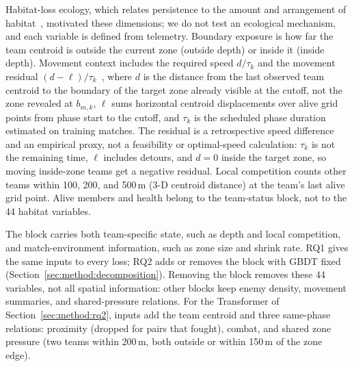 \documentclass[sigconf,anonymous,nonacm]{acmart}
\begin{document}
Habitat-loss ecology, which relates persistence to the amount and arrangement of habitat~\cite{Fahrig03}, motivated these dimensions; we do not test an ecological mechanism, and each variable is defined from telemetry. Boundary exposure is how far the team centroid is outside the current zone (outside depth) or inside it (inside depth). Movement context includes the required speed $d/\tau_k$ and the movement residual $(d-\ell)/\tau_k$~\cite{Nathan08}, where $d$ is the distance from the last observed team centroid to the boundary of the target zone already visible at the cutoff, not the zone revealed at $b_{m,k}$, $\ell$ sums horizontal centroid displacements over alive grid points from phase start to the cutoff, and $\tau_k$ is the scheduled phase duration estimated on training matches. The residual is a retrospective speed difference and an empirical proxy, not a feasibility or optimal-speed calculation: $\tau_k$ is not the remaining time, $\ell$ includes detours, and $d=0$ inside the target zone, so moving inside-zone teams get a negative residual. Local competition counts other teams within 100, 200, and 500\,m (3-D centroid distance) at the team's last alive grid point. Alive members and health belong to the team-status block, not to the 44 habitat variables.

The block carries both team-specific state, such as depth and local competition, and match-environment information, such as zone size and shrink rate. RQ1 gives the same inputs to every loss; RQ2 adds or removes the block with GBDT fixed (Section~\ref{sec:method:decomposition}). Removing the block removes these 44 variables, not all spatial information: other blocks keep enemy density, movement summaries, and shared-pressure relations. For the Transformer of Section~\ref{sec:method:rq2}, inputs add the team centroid and three same-phase relations: proximity (dropped for pairs that fought), combat, and shared zone pressure (two teams within 200\,m, both outside or within 150\,m of the zone edge).
\end{document}
